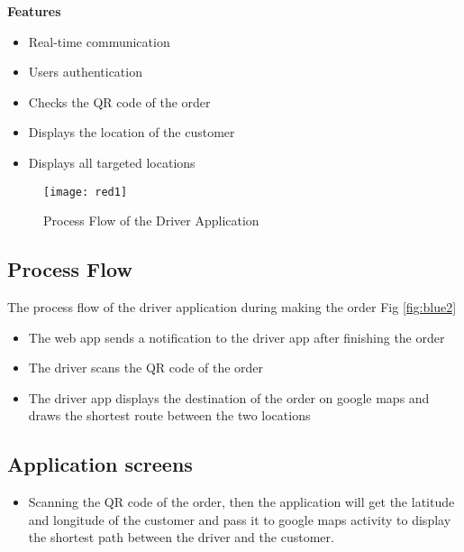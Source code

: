 \textbf{Features}
\begin{itemize}
    \item Real-time communication
    \item Users authentication
    \item Checks the QR code of the order
    \item Displays the location of the customer
    \item Displays all targeted locations
\end{itemize}


\begin{figure}[h]
    \texttt{[image: red1]}
    \centering
    \caption{Process Flow of the Driver Application}
    \label{fig:red1}
\end{figure}

\subsection{Process Flow}

The process flow of the driver application during making the order Fig \ref{fig:blue2}
\begin{itemize}
    \item The web app sends a notification to the driver app after finishing the order
    \item The driver scans the QR code of the order
    \item The driver app displays the destination of the order on google maps and draws the shortest
    route between the two locations
\end{itemize}


\subsection{Application screens}
\begin{itemize}
    \item Scanning the QR code of the order, then the application will get the latitude and longitude of
    the customer and pass it to google maps activity to display the shortest path between the
    driver and the customer.
\end{itemize}